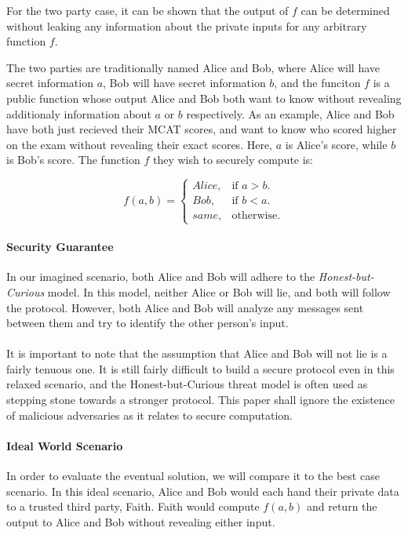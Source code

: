 For the two party case, it can be shown that the output of $f$ can be determined without leaking any information about the private inputs for any arbitrary function $f$.

The two parties are traditionally named Alice and Bob, where Alice will have secret information $a$, Bob will have secret information $b$, and the funciton $f$ is a public function whose output Alice and Bob both want to know without revealing additionaly information about $a$ or $b$ respectively. As an example, Alice and Bob have both just recieved their MCAT scores, and want to know who scored higher on the exam without revealing their exact scores. Here, $a$ is Alice's score, while $b$ is Bob's score. The function $f$ they wish to securely compute is:  

\begin{equation}
f(a,b)= \begin{cases}
Alice, & \text{if $a > b$}.\\
Bob, & \text{if $b < a$}.\\
same, & \text{otherwise}.
\end{cases}
\end{equation}

\paragraph{Security Guarantee}
In our imagined scenario, both Alice and Bob will adhere to the \textit{Honest-but-Curious} model. In this model, neither Alice or Bob will lie, and both will follow the protocol. However, both Alice and Bob will analyze any messages sent between them and try to identify the other person's input.

\paragraph{}
It is important to note that the assumption that Alice and Bob will not lie is a fairly tenuous one. It is still fairly difficult to build a secure protocol even in this relaxed scenario, and the Honest-but-Curious threat model is often used as stepping stone towards a stronger protocol. This paper shall ignore the existence of malicious adversaries as it relates to secure computation.

\paragraph{Ideal World Scenario}
In order to evaluate the eventual solution, we will compare it to the best case scenario. In this ideal scenario, Alice and Bob would each hand their private data to a trusted third party, Faith. Faith would compute $f(a,b)$ and return the output to Alice and Bob without revealing either input.

